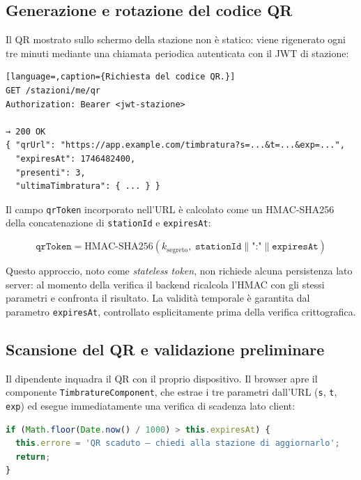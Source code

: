 \subsection{Generazione e rotazione del codice QR}
\label{subsec:qr}

Il QR mostrato sullo schermo della stazione non è statico: viene
rigenerato ogni tre minuti mediante una chiamata periodica autenticata
con il JWT di stazione:

\begin{lstlisting}[language=,caption={Richiesta del codice QR.}]
GET /stazioni/me/qr
Authorization: Bearer <jwt-stazione>

→ 200 OK
{ "qrUrl": "https://app.example.com/timbratura?s=...&t=...&exp=...",
  "expiresAt": 1746482400,
  "presenti": 3,
  "ultimaTimbratura": { ... } }
\end{lstlisting}

Il campo \texttt{qrToken} incorporato nell'URL è calcolato come un
\textsc{HMAC-SHA256} della concatenazione di \texttt{stationId} e
\texttt{expiresAt}:

\[
  \mathtt{qrToken} = \mathrm{HMAC\text{-}SHA256}\!\left(k_{\mathrm{segreto}},\;
    \mathtt{stationId} \mathbin{\|} \texttt{":"} \mathbin{\|} \mathtt{expiresAt}
  \right)
\]

Questo approccio, noto come \emph{stateless token}, non richiede alcuna
persistenza lato server: al momento della verifica il backend ricalcola
l'HMAC con gli stessi parametri e confronta il risultato. La validità
temporale è garantita dal parametro \texttt{expiresAt}, controllato
esplicitamente prima della verifica crittografica.

\subsection{Scansione del QR e validazione preliminare}
\label{subsec:scansione}

Il dipendente inquadra il QR con il proprio dispositivo. Il browser
apre il componente \texttt{TimbratureComponent}, che estrae i tre
parametri dall'URL (\texttt{s}, \texttt{t}, \texttt{exp}) ed esegue
immediatamente una verifica di scadenza lato client:

\begin{lstlisting}[language=TypeScript,caption={Verifica scadenza QR lato frontend.}]
if (Math.floor(Date.now() / 1000) > this.expiresAt) {
  this.errore = 'QR scaduto — chiedi alla stazione di aggiornarlo';
  return;
}
\end{lstlisting}


